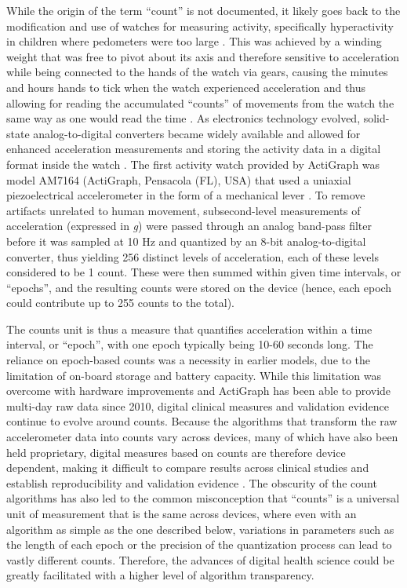 \documentclass{bmcart}
\begin{document}
While the origin of the term “count” is not documented, it likely goes back to
the modification and use of watches for measuring activity, specifically
hyperactivity in children where pedometers were too large
\cite{bell_adaptation_1968, johnson_hyperactivity_1971,maccoby_activity_1965,
	schulman_objective_1959}. This was achieved by a winding weight that was free
to pivot about its axis and therefore sensitive to acceleration while being
connected to the hands of the watch via gears, causing the minutes and hours
hands to tick when the watch experienced acceleration and thus allowing for
reading the accumulated “counts” of movements from the watch the same way as
one would read the time \cite{schulman_objective_1959}. As electronics
technology evolved, solid-state analog-to-digital converters became widely
available and allowed for enhanced acceleration measurements and storing the
activity data in a digital format inside the watch
\cite{redmond_observations_1985, taylor_new_1982, tryon_fully_1996}. The first
activity watch provided by ActiGraph was model AM7164 (ActiGraph, Pensacola
(FL), USA) that used a uniaxial piezoelectrical accelerometer in the form of a
mechanical lever \cite{tryon_fully_1996}. To remove artifacts unrelated to
human movement, subsecond-level measurements of acceleration (expressed in \textit{g})
were passed through an analog band-pass filter before it was sampled at 10 Hz
and quantized by an 8-bit analog-to-digital converter, thus yielding 256
distinct levels of acceleration, each of these levels considered to be 1 count.
These were then summed within given time intervals, or “epochs”, and the
resulting counts were stored on the device (hence, each epoch could contribute
up to 255 counts to the total).

The counts unit is thus a measure that quantifies acceleration within a time
interval, or “epoch”, with one epoch typically being 10-60 seconds long. The
reliance on epoch-based counts was a necessity in earlier models, due to the
limitation of on-board storage and battery capacity. While this limitation was
overcome with hardware improvements and ActiGraph has been able to provide
multi-day raw data since 2010, digital clinical measures and validation
evidence continue to evolve around counts.  Because the algorithms that
transform the raw accelerometer data into counts vary across devices, many of
which have also been held proprietary, digital measures based on counts are
therefore device dependent, making it difficult to compare results across
clinical studies and establish reproducibility and validation evidence
\cite{jul_4_comparing_2001,paul_comparison_2007, straker_translation_2012}. The
obscurity of the count algorithms has also led to the common misconception that
“counts” is a universal unit of measurement that is the same across devices,
where even with an algorithm as simple as the one described below, variations
in parameters such as the length of each epoch or the precision of the
quantization process can lead to vastly different counts. Therefore, the
advances of digital health science could be greatly facilitated with a higher
level of algorithm transparency.
\end{document}

